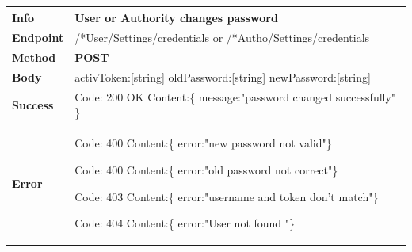 \begin{table}[H]
\begin{tabular}{|l|p{}|}
\hline
\textbf{Info}             & User or Authority changes password                                                                    \\ \hline
\textbf{Endpoint}    &  /*User/Settings/credentials or /*Autho/Settings/credentials\\ \hline
\textbf{Method}         &   \textbf{POST}                                                                            \\ \hline

\textbf{Body}  & activToken:[string]\newline
oldPassword:[string]\newline
newPassword:[string]\newline
                    \\ \hline
                    
\textbf{Success} &  Code: 200 OK \newline
                    Content:\{\newline 
                    message:"password changed successfully"\newline
                    \}\\ \hline
\textbf{Error} &  Code: 400 \newline
                  Content:\{\newline
                  error:"new password not valid"\newline\}\newline
                  
                  Code: 400 \newline
                  Content:\{\newline
                  error:"old password not correct"\newline\}\newline
                  
                  Code: 403 \newline
                  Content:\{\newline
                  error:"username and token don't match"\newline\}\newline
                  
                  Code: 404 \newline
                  Content:\{\newline
                  error:"User not found "\newline\}\\\hline

\end{tabular}
\end{table}



